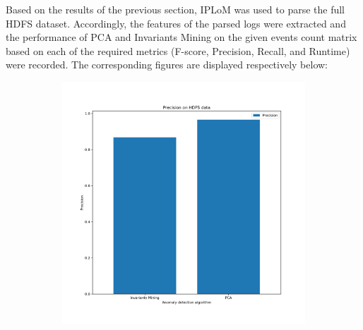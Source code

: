 \documentclass[12pt,a4paper]{article}
\begin{document}
	\noindent Based on the results of the previous section, IPLoM was used to parse the full HDFS dataset. Accordingly, the features of the parsed logs were extracted and the performance of PCA and Invariants Mining on the given events count matrix based on each of the required metrics (F-score, Precision, Recall, and Runtime) were recorded. The corresponding figures are displayed respectively below:
	
	\begin{figure}[H]
		\centering
		\begin{subfigure}[H]{0.45\textwidth}
			\centering
			\includegraphics[width=1.3\textwidth]{Figures/Precision_2}
			

\end{subfigure}
\end{figure}
\end{document}
